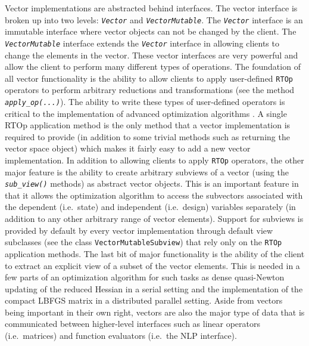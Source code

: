 \documentclass[pdf,12pt,report]{SANDreport}
\begin{document}
Vector implementations are abstracted behind interfaces.  The vector interface
is broken up into two levels: {}\texttt{\textit{Vector}} and
{}\texttt{\textit{Vector\-Mutable}}.  The {}\texttt{\textit{Vector}} interface
is an immutable interface where vector objects can not be changed by the
client.  The {}\texttt{\textit{Vector\-Mutable}} interface extends the
{}\texttt{\textit{Vector}} interface in allowing clients to change the
elements in the vector.  These vector interfaces are very powerful and allow
the client to perform many different types of operations.  The foundation of
all vector functionality is the ability to allow clients to apply user-defined
{}\texttt{RTOp} operators to perform arbitrary reductions and transformations
(see the method {}\texttt{\textit{apply\_op(...)}}). The ability to write
these types of user-defined operators is critical to the implementation of
advanced optimization algorithms {}\cite{ref:rtop_toms}.  A single RTOp
application method is the only method that a vector implementation is required
to provide (in addition to some trivial methods such as returning the vector
space object) which makes it fairly easy to add a new vector implementation.
In addition to allowing clients to apply {}\texttt{RTOp} operators, the other
major feature is the ability to create arbitrary subviews of a vector (using
the {}\texttt{\textit{sub\_view()}} methods) as abstract vector objects.  This
is an important feature in that it allows the optimization algorithm to access
the subvectors associated with the dependent (i.e.\ state) and independent
(i.e.\ design) variables separately (in addition to any other arbitrary range
of vector elements).  Support for subviews is provided by default by every
vector implementation through default view subclasses (see the class
{}\texttt{Vector\-Mutable\-Subview}) that rely only on the {}\texttt{RTOp}
application methods.  The last bit of major functionality is the ability of
the client to extract an explicit view of a subset of the vector elements.
This is needed in a few parts of an optimization algorithm for such tasks as
dense quasi-Newton updating of the reduced Hessian in a serial setting and the
implementation of the compact LBFGS matrix in a distributed parallel setting.
Aside from vectors being important in their own right, vectors are also the
major type of data that is communicated between higher-level interfaces such
as linear operators (i.e.\ matrices) and function evaluators (i.e.\ the NLP
interface).
\end{document}
